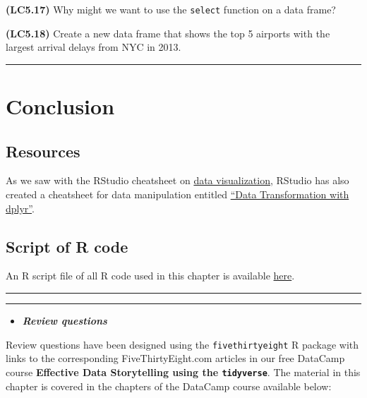 \documentclass[]{tufte-book}
\let\oldrule=\rule
\renewcommand{\rule}[1]{\oldrule{\linewidth}}
\newenvironment{rmdblock}[1]
  {\begin{shaded*}
  \begin{itemize}
  \renewcommand{\labelitemi}{
    \raisebox{-.7\height}[0pt][0pt]{
    }
  }
  \item
  }
  {
  \end{itemize}
  \end{shaded*}
  }
\newenvironment{review}
  {\begin{rmdblock}{warning}}
  {\end{rmdblock}}
\begin{document}
\textbf{(LC5.17)} Why might we want to use the \texttt{select} function
on a data frame?

\textbf{(LC5.18)} Create a new data frame that shows the top 5 airports
with the largest arrival delays from NYC in 2013.

\begin{center}\rule{0.5\linewidth}{\linethickness}\end{center}

\section{Conclusion}\label{conclusion-1}

\subsection{Resources}\label{resources-1}

As we saw with the RStudio cheatsheet on
\href{https://www.rstudio.com/wp-content/uploads/2016/11/ggplot2-cheatsheet-2.1.pdf}{data
visualization}, RStudio has also created a cheatsheet for data
manipulation entitled
\href{https://github.com/rstudio/cheatsheets/raw/master/source/pdfs/data-transformation-cheatsheet.pdf}{``Data
Transformation with dplyr''}.

\subsection{Script of R code}\label{script-of-r-code-1}

An R script file of all R code used in this chapter is available
\href{http://ismayc.github.io/moderndiver-book/scripts/05-manip.R}{here}.

\begin{center}\rule{0.5\linewidth}{\linethickness}\end{center}

\begin{center}\rule{0.5\linewidth}{\linethickness}\end{center}

\begin{review}
\textbf{\emph{Review questions}}
\end{review}

Review questions have been designed using the \texttt{fivethirtyeight} R
package \citep{R-fivethirtyeight} with links to the corresponding
FiveThirtyEight.com articles in our free DataCamp course
\textbf{Effective Data Storytelling using the \texttt{tidyverse}}. The
material in this chapter is covered in the chapters of the DataCamp
course available below:
\end{document}
